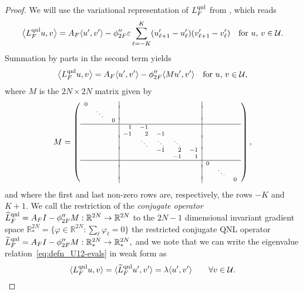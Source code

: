 \documentclass[12pt,reqno]{amsart}
\begin{document}
\begin{proof}
  We will use the variational representation of ${L^{{\rm qnl}}_F}$ from
  \cite[Section 3.3]{doblusort:qce.stab}, which reads
  \begin{displaymath}
    \big{\langle} {L^{{\rm qnl}}_F} u, v \big{\rangle} = A_F {\langle} u', v' {\rangle}
    -  \phi_{2F}'' {\varepsilon} \sum_{\ell = -K}^{K} (u_{\ell+1}' - u_\ell')
    (v_{\ell+1}' - v_\ell') \quad \text{for } u,\,v \in{\mathcal{U}}.
  \end{displaymath}
  Summation by parts in the second term yields
  \begin{displaymath}
    \big{\langle} {L^{{\rm qnl}}_F} u, v \big{\rangle} = A_F {\langle} u', v'{\rangle} - \phi_{2F}'' {\langle} M u', v' {\rangle} \quad \text{for } u,\,v \in{\mathcal{U}},
  \end{displaymath}
  where $M$ is the $2N \times 2N$ matrix given by
  \begin{displaymath}
    M = {\scriptsize \left(\begin{array}{rrr|rrrrr|rrr}
      0 &      &   &    &      &      &      &    &   &      &   \\[-1mm]
        &\ddots&   &    &      &      &      &    &   &      &   \\[-1mm]
        &      & 0 &    &      &      &      &    &   &      &   \\
        \hline
        &      &   &  1 &   -1 &      &      &    &   &      &   \\
        &      &   & -1 &    2 &   -1 &      &    &   &      &   \\[-1mm]
        &      &   &    &\ddots&\ddots&\ddots&    &   &      &   \\[-1mm]
        &      &   &    &      &   -1 &    2 & -1 &   &      &   \\
        &      &   &    &      &      &   -1 &  1 &   &      &   \\
        \hline
        &      &   &    &      &      &      &    & 0 &      &   \\[-1mm]
        &      &   &    &      &      &      &    &   &\ddots&   \\[-1mm]
        &      &   &    &      &      &      &    &   &      & 0
    \end{array} \right), }
\end{displaymath}
and where the first and last non-zero rows are, respectively, the rows
$-K$ and $K+1$.  We call the restriction of the {\em conjugate
  operator} ${\widehat{L}^{{\rm qnl}}_F}=A_F I - \phi_{2F}'' M:{\mathbb{R}}^{2N}\to {\mathbb{R}}^{2N}$ to
the $2N-1$ dimensional invariant gradient space ${\mathbb{R}}^{2N}_* = \{
\varphi \in {\mathbb{R}}^{2N} : \sum_\ell \varphi_\ell = 0 \}$ the restricted
conjugate QNL operator ${\widetilde{L}^{{\rm qnl}}_F}=A_F I - \phi_{2F}'' M:{\mathbb{R}}^{2N}_*\to
{\mathbb{R}}^{2N}_*,$ and we note that we can write the eigenvalue
relation~\eqref{eq:defn_U12-evals} in weak form as
\begin{equation}\label{same}
    {\langle} {L^{{\rm qnl}}_F} u, v {\rangle} = {\langle} {\widetilde{L}^{{\rm qnl}}_F} u', v' {\rangle} = \lambda {\langle} u',
    v'{\rangle} \qquad \forall v\in{\mathcal{U}}.
\end{equation}


\end{proof}
\end{document}
